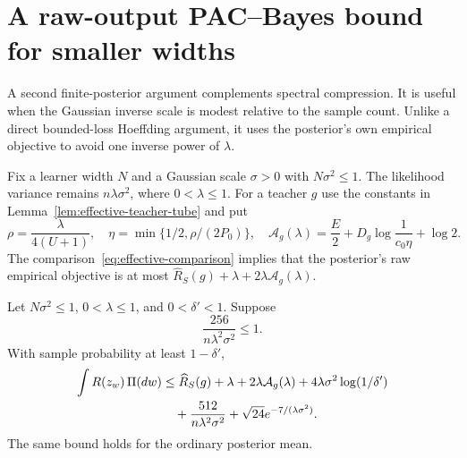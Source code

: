 \section{A raw-output PAC--Bayes bound for smaller widths}
\label{sec:raw-small-width}

A second finite-posterior argument complements spectral compression.
It is useful when the Gaussian inverse scale is modest relative to the
sample count.  Unlike a direct bounded-loss Hoeffding argument, it uses
the posterior's own empirical objective to avoid one inverse power of
$\lambda$.

Fix a learner width $N$ and a Gaussian scale $\sigma>0$ with
$N\sigma^2\leq1$.  The likelihood variance remains
$n\lambda\sigma^2$, where $0<\lambda\leq1$.  For a teacher $g$ use the
constants in Lemma~\ref{lem:effective-teacher-tube} and put
\begin{equation}
 \rho=\frac\lambda{4(U+1)},\quad
 \eta=\min\{1/2,\rho/(2P_0)\},\quad
 \mathcal A_g(\lambda)=\frac E2
          +D_g\log\frac1{c_0\eta}+\log2.
 \label{eq:raw-small-Ag}
\end{equation}
The comparison~\eqref{eq:effective-comparison} implies that the
posterior's raw empirical objective is at most
$\widehat R_S(g)+\lambda+2\lambda\mathcal A_g(\lambda)$.

\begin{lemma}
\label{lem:raw-small-width}
Let $N\sigma^2\leq1$, $0<\lambda\leq1$, and $0<\delta'<1$.  Suppose
\begin{equation}
 \frac{256}{n\lambda^2\sigma^2}\leq1.
 \label{eq:raw-small-calibration}
\end{equation}
With sample probability at least $1-\delta'$,
\begin{align}
 \int R(z_w)\,\Pi(dw)
 &\leq\widehat R_S(g)+\lambda+2\lambda\mathcal A_g(\lambda)
       +4\lambda\sigma^2\log(1/\delta')\notag\\
 &\quad+\frac{512}{n\lambda^2\sigma^2}
                   +\sqrt{24}e^{-7/(\lambda\sigma^2)}.
 \label{eq:raw-small-width-bound}
\end{align}
The same bound holds for the ordinary posterior mean.
\end{lemma}

